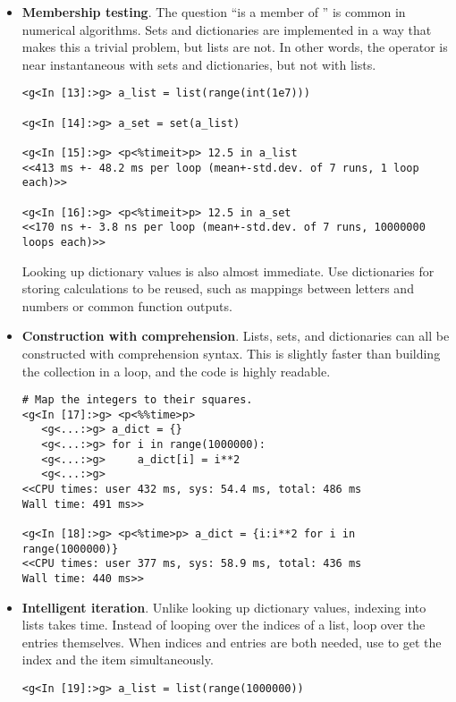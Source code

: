 \begin{itemize}
\item \textbf{Membership testing}. The question ``is  a member of '' is common in numerical algorithms.
Sets and dictionaries are implemented in a way that makes this a trivial problem, but lists are not.
In other words, the  operator is near instantaneous with sets and dictionaries, but not with lists.

\begin{lstlisting}
<g<In [13]:>g> a_list = list(range(int(1e7)))

<g<In [14]:>g> a_set = set(a_list)

<g<In [15]:>g> <p<%timeit>p> 12.5 in a_list
<<413 ms +- 48.2 ms per loop (mean+-std.dev. of 7 runs, 1 loop each)>>

<g<In [16]:>g> <p<%timeit>p> 12.5 in a_set
<<170 ns +- 3.8 ns per loop (mean+-std.dev. of 7 runs, 10000000 loops each)>>
\end{lstlisting}

Looking up dictionary values is also almost immediate.
Use dictionaries for storing calculations to be reused, such as mappings between letters and numbers or common function outputs.

\item \textbf{Construction with comprehension}.
Lists, sets, and dictionaries can all be constructed with comprehension syntax.
This is slightly faster than building the collection in a loop, and the code is highly readable.

\begin{lstlisting}
# Map the integers to their squares.
<g<In [17]:>g> <p<%%time>p>
   <g<...:>g> a_dict = {}
   <g<...:>g> for i in range(1000000):
   <g<...:>g>     a_dict[i] = i**2
   <g<...:>g>
<<CPU times: user 432 ms, sys: 54.4 ms, total: 486 ms
Wall time: 491 ms>>

<g<In [18]:>g> <p<%time>p> a_dict = {i:i**2 for i in range(1000000)}
<<CPU times: user 377 ms, sys: 58.9 ms, total: 436 ms
Wall time: 440 ms>>
\end{lstlisting}

\item \textbf{Intelligent iteration}.
Unlike looking up dictionary values, indexing into lists takes time.
Instead of looping over the indices of a list, loop over the entries themselves.
When indices and entries are both needed, use  to get the index and the item simultaneously.

\begin{lstlisting}
<g<In [19]:>g> a_list = list(range(1000000))


\end{lstlisting}
\end{itemize}

